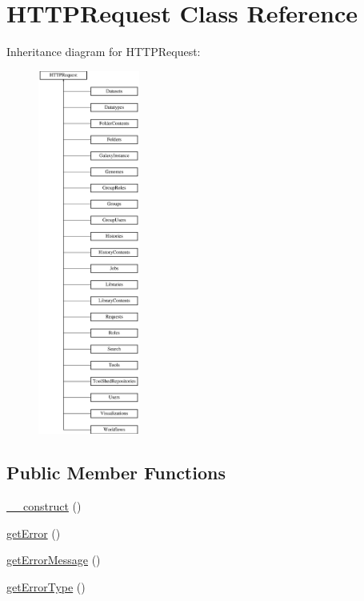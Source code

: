 \hypertarget{classHTTPRequest}{}\section{H\+T\+T\+P\+Request Class Reference}
\label{classHTTPRequest}
Inheritance diagram for H\+T\+T\+P\+Request\+:\begin{figure}[H]
\begin{center}
\leavevmode
\includegraphics[height=12.000000cm]{classHTTPRequest}
\end{center}
\end{figure}
\subsection*{Public Member Functions}
\begin{DoxyCompactItemize}
\item 
\hyperlink{classHTTPRequest_a4e8d9f9045aec31421fe7a351a670192}{\+\_\+\+\_\+construct} ()
\item 
\hyperlink{classHTTPRequest_acdbc89e298a3ab5beb0a00f4c67646ad}{get\+Error} ()
\item 
\hyperlink{classHTTPRequest_a8e705d701b167a71861e53c329f12824}{get\+Error\+Message} ()
\item 
\hyperlink{classHTTPRequest_a876aad5c328ef5a71345a04ff697def5}{get\+Error\+Type} ()
\end{DoxyCompactItemize}
